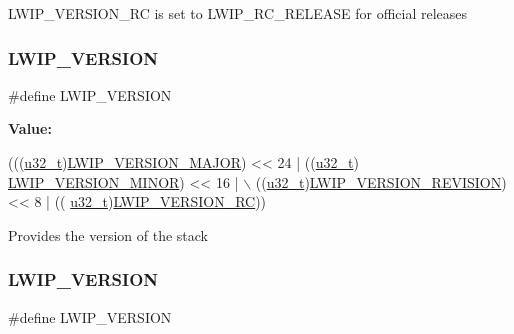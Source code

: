L\+W\+I\+P\+\_\+\+V\+E\+R\+S\+I\+O\+N\+\_\+\+RC is set to L\+W\+I\+P\+\_\+\+R\+C\+\_\+\+R\+E\+L\+E\+A\+SE for official releases \mbox{\label{group__lwip__version_ga0a0d322fad0a67aa5b8f1b8c9dfcfe59}} 
\subsubsection{\texorpdfstring{L\+W\+I\+P\+\_\+\+V\+E\+R\+S\+I\+ON}{LWIP\_VERSION}\hspace{0.1cm}{\footnotesize\ttfamily [1/2]}}
{\footnotesize\ttfamily \#define L\+W\+I\+P\+\_\+\+V\+E\+R\+S\+I\+ON}

{\bfseries Value\+:}
\begin{DoxyCode}
(((\hyperlink{group__compiler__abstraction_ga4c14294869aceba3ef9d4c0c302d0f33}{u32\_t})\hyperlink{group__lwip__version_ga4308c06ef36496e00c798d96d7d03246}{LWIP\_VERSION\_MAJOR}) << 24   | ((\hyperlink{group__compiler__abstraction_ga4c14294869aceba3ef9d4c0c302d0f33}{u32\_t})
      \hyperlink{group__lwip__version_ga1e596388c15ba81e753c5633fad1c034}{LWIP\_VERSION\_MINOR}) << 16 | \(\backslash\)
                        ((\hyperlink{group__compiler__abstraction_ga4c14294869aceba3ef9d4c0c302d0f33}{u32\_t})\hyperlink{group__lwip__version_ga0a57983df1b199cf39a2e6a2d90e3d50}{LWIP\_VERSION\_REVISION}) << 8 | ((
      \hyperlink{group__compiler__abstraction_ga4c14294869aceba3ef9d4c0c302d0f33}{u32\_t})\hyperlink{group__lwip__version_gac1dc92d8f453a98560de7e2e00a221a1}{LWIP\_VERSION\_RC}))
\end{DoxyCode}
Provides the version of the stack \mbox{\label{group__lwip__version_ga0a0d322fad0a67aa5b8f1b8c9dfcfe59}} 
\subsubsection{\texorpdfstring{L\+W\+I\+P\+\_\+\+V\+E\+R\+S\+I\+ON}{LWIP\_VERSION}\hspace{0.1cm}{\footnotesize\ttfamily [2/2]}}
{\footnotesize\ttfamily \#define L\+W\+I\+P\+\_\+\+V\+E\+R\+S\+I\+ON}

